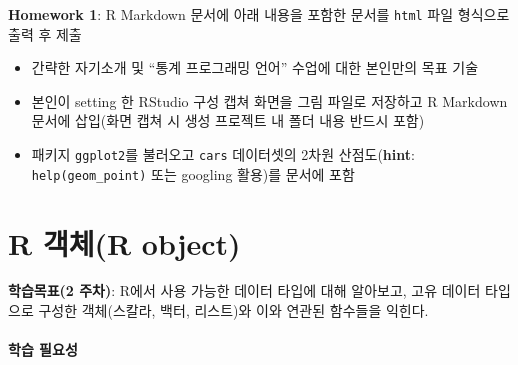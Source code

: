 \documentclass[
  11pt,
]{krantz}
\makeatletter
\providecommand{\tightlist}{%
  \setlength{\itemsep}{0pt}\setlength{\parskip}{0pt}}
\newenvironment{kframe}{%
\medskip{}
\setlength{\fboxsep}{.8em}
 \def\at@end@of@kframe{}%
 \ifinner\ifhmode%
  \def\at@end@of@kframe{\end{minipage}}%
  \begin{minipage}{\columnwidth}%
 \fi\fi%
 \def\FrameCommand##1{\hskip\@totalleftmargin \hskip-\fboxsep
 \colorbox{shadecolor}{##1}\hskip-\fboxsep
     \hskip-\linewidth \hskip-\@totalleftmargin \hskip\columnwidth}%
 \MakeFramed {\advance\hsize-\width
   \@totalleftmargin\z@ \linewidth\hsize
   \@setminipage}}%
 {\par\unskip\endMakeFramed%
 \at@end@of@kframe}
\newenvironment{rmdblock}[1]
  {
  \begin{itemize}
  \renewcommand{\labelitemi}{
    \raisebox{-.7\height}[0pt][0pt]{
      {\setkeys{Gin}{width=3em,keepaspectratio}\texttt{[image: images/\#1]}}
    }
  }
  \setlength{\fboxsep}{1em}
  \begin{kframe}
  \item
  }
  {
  \end{kframe}
  \end{itemize}
  }
\newenvironment{rmdnote}
  {\begin{rmdblock}{note}}
  {\end{rmdblock}}
\newenvironment{rmdimportant}
  {\begin{rmdblock}{important}}
  {\end{rmdblock}}
\makeatother
\begin{document}
\normalsize

\footnotesize

\begin{rmdimportant}
\begin{rmdimportant}

\textbf{Homework 1}: R Markdown 문서에 아래 내용을 포함한 문서를 \texttt{html} 파일 형식으로 출력 후 제출

\begin{itemize}
\tightlist
\item
  간략한 자기소개 및 ``통계 프로그래밍 언어'' 수업에 대한 본인만의 목표 기술
\item
  본인이 setting 한 RStudio 구성 캡쳐 화면을 그림 파일로 저장하고 R Markdown 문서에 삽입(화면 캡쳐 시 생성 프로젝트 내 폴더 내용 반드시 포함)
\item
  패키지 \texttt{ggplot2}를 불러오고 \texttt{cars} 데이터셋의 2차원 산점도(\textbf{hint}: \texttt{help(geom\_point)} 또는 googling 활용)를 문서에 포함
\end{itemize}

\end{rmdimportant}
\end{rmdimportant}

\normalsize

\hypertarget{data-type}{%
\chapter{R 객체(R object)}\label{data-type}}

\footnotesize

\begin{rmdnote}
\begin{rmdnote}

\textbf{학습목표(2 주차)}: R에서 사용 가능한 데이터 타입에 대해 알아보고, 고유 데이터 타입으로 구성한 객체(스칼라, 백터, 리스트)와 이와 연관된 함수들을 익힌다.

\end{rmdnote}
\end{rmdnote}

\normalsize

\hypertarget{ch2-abstract}{%
\subsubsection*{학습 필요성}\label{ch2-abstract}}
\end{document}
